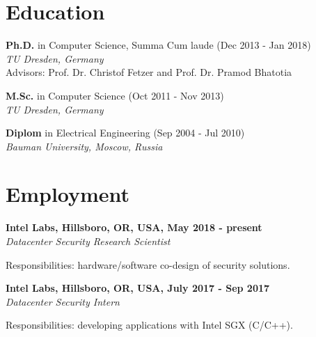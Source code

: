 \documentclass[letterpaper]{article}
\renewenvironment{itemize}{
  \begin{list}{}{
    \setlength{\leftmargin}{1.5em}
  }
}{
  \end{list}
}
\begin{document}
\section*{Education}

\begin{itemize}

 \item \textbf{Ph.D.} in Computer Science, Summa Cum laude (Dec 2013 - Jan 2018)\\
 {\em  TU Dresden, Germany}\\
Advisors: Prof. Dr. Christof Fetzer and Prof. Dr. Pramod Bhatotia

 \item \textbf{M.Sc.} in Computer Science (Oct 2011 - Nov 2013) \\
 {\em  TU Dresden, Germany}

\item \textbf{Diplom} in Electrical Engineering (Sep 2004 - Jul 2010)\\
  {\em Bauman University, Moscow, Russia} 

\end{itemize}



\section*{Employment}

{\bf Intel Labs, Hillsboro, OR, USA, May 2018 - present}\\
{\em Datacenter Security Research Scientist}
\begin{itemize}
    \vspace{-2mm}
	\item Responsibilities: hardware/software co-design of security solutions.
\end{itemize}

\vspace{2mm}

{\bf Intel Labs, Hillsboro, OR, USA, July 2017 - Sep 2017}\\
{\em Datacenter Security Intern}
\begin{itemize}
    \vspace{-2mm}
	\item Responsibilities: developing applications with Intel SGX (C/C++).
\end{itemize}
\end{document}
